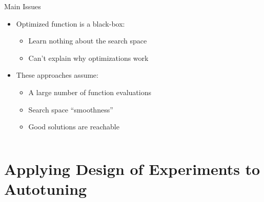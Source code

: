 \documentclass[10pt, compress, aspectratio=169, xcolor={table,usenames,dvipsnames}]{beamer}
\begin{document}
\begin{frame}
\begin{columns}[c]
            \begin{block}{Main Issues}
                \begin{itemize}
                    \item Optimized function is a \alert{black-box}:
                        \begin{itemize}
                            \item \alert{Learn nothing} about the search space
                            \item \alert{Can't explain} why optimizations work
                        \end{itemize}
                    \item These approaches \alert{assume}:
                        \begin{itemize}
                            \item A \alert{large number of function evaluations}
                            \item Search space \alert{``smoothness''}
                            \item Good solutions are \alert{reachable}
                        \end{itemize}
                \end{itemize}
            \end{block}

    \end{columns}
\end{frame}

\section{Applying Design of Experiments to Autotuning}
\end{document}
